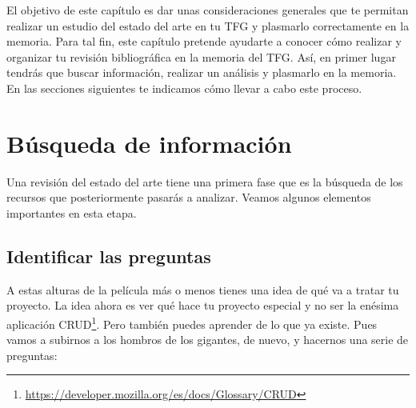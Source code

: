 El objetivo de este capítulo es dar unas consideraciones generales que te permitan realizar un estudio del estado del arte en tu TFG y plasmarlo correctamente en la memoria. Para tal fin, este capítulo pretende ayudarte a conocer cómo realizar y organizar tu revisión bibliográfica en la memoria del TFG. Así, en primer lugar tendrás que buscar información, realizar un análisis y plasmarlo en la memoria. En las secciones siguientes te indicamos cómo llevar a cabo este proceso.

\section{Búsqueda de información}

Una revisión del estado del arte tiene una primera fase que es la búsqueda de los recursos que posteriormente pasarás a analizar. Veamos algunos elementos importantes en esta etapa.

\subsection{Identificar las preguntas}


A estas alturas de la película más o menos tienes una idea de qué va a tratar tu proyecto. La idea ahora es ver qué hace tu proyecto especial y no ser la enésima aplicación CRUD\footnote{\url{https://developer.mozilla.org/es/docs/Glossary/CRUD}}. Pero también puedes aprender de lo que ya existe. Pues vamos a subirnos a los hombros de los gigantes, de nuevo, y hacernos una serie de preguntas:


